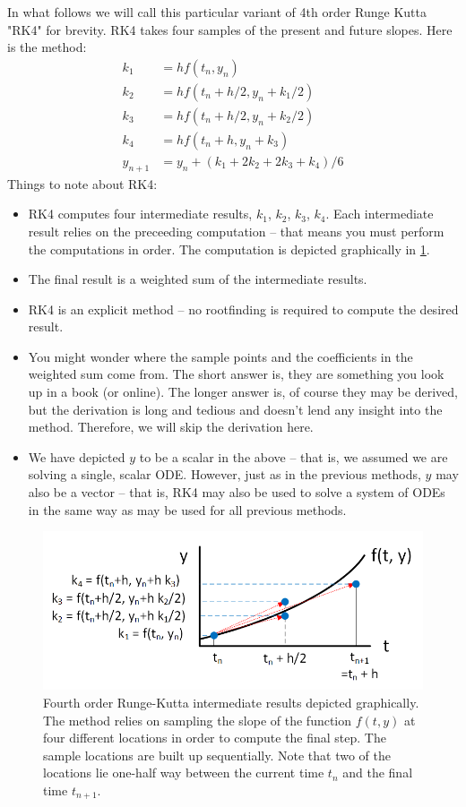\documentclass[hidelinks,notitlepage]{book}
\begin{document}
In what follows we will call this particular variant of 4th order Runge Kutta "RK4" for brevity.  RK4 takes four samples of the present and future slopes.  Here is the method:
\begin{align}
	\nonumber
    k_1 &= h f(t_n, y_n) \\
	\nonumber
	k_2 &= h f(t_n+h/2, y_n + k_1/2) \\
	\nonumber
	k_3 &= h f(t_n+h/2, y_n + k_2/2) \\
	\nonumber
	k_4 &= h f(t_n+h, y_n + k_3) \\
	\nonumber
	y_{n+1} &= y_n + (k_1 + 2 k_2 + 2 k_3 + k_4)/6
\end{align}
Things to note about RK4:
\begin{itemize}
	\item RK4 computes four intermediate results, $k_1$, $k_2$, $k_3$, $k_4$.  Each intermediate result relies on the preceeding computation -- that means you must perform the computations in order.  The computation is depicted graphically in \cref{fig:RungeKuttaSamplePoints}.
	\item The final result is a weighted sum of the intermediate results.
	\item RK4 is an explicit method -- no rootfinding is required to compute the desired result.
	\item You might wonder where the sample points and the coefficients in the weighted sum come from.  The short answer is, they are something you look up in a book (or online).  The longer answer is, of course they may be derived, but the derivation is long and tedious and doesn't lend any insight into the method.  Therefore, we will skip the derivation here.
	\item We have depicted $y$ to be a scalar in the above -- that is, we assumed we are solving a single, scalar ODE.  However, just as in the previous methods, $y$ may also be a vector -- that is, RK4 may also  be used to solve a system of ODEs in the same way as may be used for all previous methods.
\end{itemize}
\begin{figure}[tbh]
	\centering
	\includegraphics[width=0.7\columnwidth]{RungeKuttaSamplePoints.png}
	\caption{Fourth order Runge-Kutta intermediate results depicted graphically.  The method relies on sampling the slope of the function $f(t, y)$ at four different locations in order to compute the final step.  The sample locations are built up sequentially.  Note that two of the locations lie one-half way between the current time $t_n$ and the final time $t_{n+1}$.}
	\label{fig:RungeKuttaSamplePoints}
\end{figure}
\end{document}
